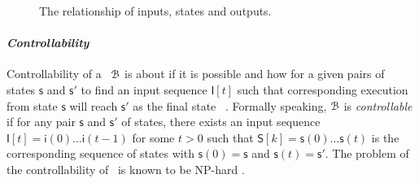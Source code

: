 \begin{figure}[!t]
      \centering
      
      \caption{The relationship of inputs, states and outputs.}
      \label{fig:10}
  \end{figure}



\paragraph*{\em Controllability}  Controllability of a  \BCN\ ${\mathcal{B}}$  is  about if it is possible and how for a given pairs of states $\mathsf{s}$ and $\mathsf{s}'$  to find an input  sequence $\mathsf{I}[t]$  such that  corresponding execution from state $\mathsf{s}$ will reach $\mathsf{s}'$ as the final state ~\cite{Akutsu2007Control}. Formally speaking, ${\mathcal{B}}$ is {\em controllable} 
if for any pair $\mathsf{s}$ and $\mathsf{s}'$ of states, there  exists an input sequence $\mathsf{I}[t]=\mathsf{i}(0)\ldots\mathsf{i}(t-1)$ for some $t>0$ such that $\mathsf{S}[k]=\mathsf{s}(0)\ldots\mathsf{s}(t)$ is the corresponding sequence of states with $\mathsf{s}(0) =\mathsf{s}$ and $\mathsf{s}(t)=\mathsf{s}'$. The  problem of the controllability of \BCNs\ is known to be {NP}-hard \cite{Akutsu2007Control}. %
%

